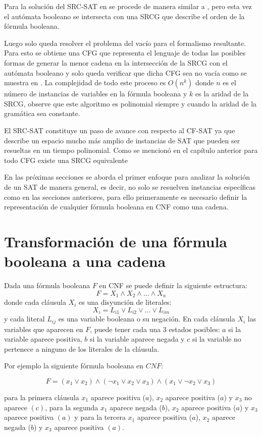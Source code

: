 \documentclass[12pt]{article}
\begin{document}
Para la solución del SRC-SAT en \cite{aSRCSAT} se procede de manera similar a \cite{aCFSAT}, pero esta vez el autómata
booleano se intersecta con una SRCG que describe el orden de la fórmula booleana.

Luego solo queda resolver el problema del vacío para el formalismo resultante. Para esto se obtiene una CFG que representa 
el lenguaje de todas las posibles formas de generar la menor cadena en la intersección de la SRCG con el autómata booleano 
y solo queda verificar que dicha CFG sea no vacía como se muestra en \cite{aCFSAT}. La complejidad de todo este proceso es 
$O(n^k)$ donde $n$ es el número de instancias de variables en la fórmula booleana y $k$ es la aridad de la SRCG, observe 
que este algoritmo es polinomial siempre y cuando la aridad de la gramática sea constante.

El SRC-SAT constituye un paso de avance con respecto al CF-SAT ya que describe un espacio mucho más amplio de instancias de SAT
que pueden ser resueltas en un tiempo polinomial. Como se mencionó en el capítulo anterior para todo CFG existe una SRCG
equivalente

En las próximas secciones se aborda el primer enfoque para analizar la solución de un SAT de manera general, es decir, no solo
se resuelven instancias específicas como en las secciones anteriores, para ello primeramente es necesario definir la representación
de cualquier fórmula booleana en CNF como una cadena.
\section{Transformación de una fórmula booleana a una cadena}

Dada una fórmula booleana $F$ en CNF se puede definir la siguiente estructura:
$$F=X_1 \wedge X_2 \wedge \ldots \wedge X_n$$
donde cada cláusula $X_i$ es una disyunción de literales:
$$X_i=L_{i1} \vee L_{i2} \vee \ldots \vee L_{im}$$
y cada literal $L_{ij}$ es una variable booleana o su negación. En cada cláusula $X_i$ las variables que aparecen en $F$, puede tener cada una 3 estados posibles: $a$ si la variable aparece positiva, $b$ si la variable aparece negada y $c$ si la variable no pertenece a ninguno de los literales de la cláusula.

Por ejemplo la siguiente fórmula booleana en $CNF$:

$$F=(x_1 \vee x_2) \wedge (\neg x_1 \vee x_2 \vee x_3) \wedge (x_1 \vee \neg x_2 \vee x_3)$$

para la primera cláusula $x_1$ aparece positiva ($a$), $x_2$ aparece positiva ($a$) y $x_3$ no aparece $(c)$, para la segunda
$x_1$ aparece negada ($b$), $x_2$ aparece positiva ($a$) y $x_3$ aparece positiva $(a)$ y para la tercera 
$x_1$ aparece positiva ($a$), $x_2$ aparece negada ($b$) y $x_3$ aparece positiva $(a)$.
\end{document}
